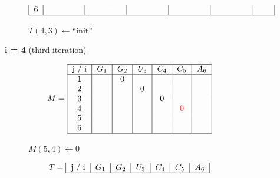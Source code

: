 \begin{figure}[H]
\begin{subfigure}[t]{0.65\textwidth}
\[\begin{tabular}{|c|c|c|c|c|c|c|}
                                    6 & \textcolor{white}{unpaired} & \textcolor{white}{unpaired} & \textcolor{white}{unpaired}
                                    & \textcolor{white}{unpaired}
                                    & \textcolor{white}{unpaired}
                                    & \textcolor{white}{init}
                                    \\ \hline
                        \end{tabular}
        \]
        \caption{$T(4,3) \gets \text{``init''}$ }
    \end{subfigure}
    \caption{\textbf{i = 4} (third iteration)}\label{fig:figure27}

\end{figure}


\begin{figure}[H]
    \centering
    \begin{subfigure}[t]{0.25\textwidth}
        \scriptsize \[
                        M =  \begin{tabular}{|c|c|c|c|c|c|c|}
                                 \hline
                                 j / i & $G_1$ & $G_2$ & $U_3$ & $C_4$ & $C_5$              & $A_6$ \\ \hline
                                 1     &       & 0     &       &       &                    &       \\
                                 2     &       &       & 0     &       &                    &       \\
                                 3     &       &       &       & 0     &                    &       \\
                                 4     &       &       &       &       & \textcolor{red}{0} &       \\
                                 5     &       &       &       &       &                    &       \\
                                 6     &       &       &       &       &                    &       \\ \hline
                        \end{tabular}
        \]
        \caption{$M(5,4) \gets 0$}
    \end{subfigure}
    \hfill
    \begin{subfigure}[t]{0.65\textwidth}
        \scriptsize \[
                        T =     \begin{tabular}{|c|c|c|c|c|c|c|}
                                    \hline
                                    j / i & $G_1$ & $G_2$ & $U_3$ & $C_4$ & $C_5$                 & $A_6$ \\ \hline

\end{tabular}\]
\end{subfigure}
\end{figure}
